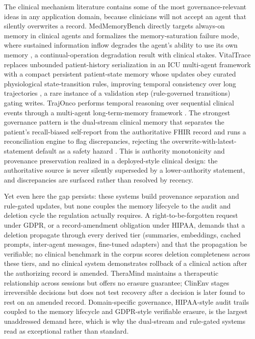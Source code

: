The clinical mechanism literature contains some of the most governance-relevant ideas in any application domain, because clinicians will not accept an agent that silently overwrites a record. MedMemoryBench directly targets always-on memory in clinical agents and formalizes the memory-saturation failure mode, where sustained information inflow degrades the agent's ability to use its own memory \citep{wang2026medmemorybench}, a continual-operation degradation result with clinical stakes. VitalTrace replaces unbounded patient-history serialization in an ICU multi-agent framework with a compact persistent patient-state memory whose updates obey curated physiological state-transition rules, improving temporal consistency over long trajectories \citep{qu2026vitaltrace}, a rare instance of a validation step (rule-governed transitions) gating writes. TrajOnco performs temporal reasoning over sequential clinical events through a multi-agent long-term-memory framework \citep{zeng2026trajonco}. The strongest governance pattern is the dual-stream clinical memory that separates the patient's recall-biased self-report from the authoritative FHIR record and runs a reconciliation engine to flag discrepancies, rejecting the overwrite-with-latest-statement default as a safety hazard \citep{pugh2026dualstream}. This is authority monotonicity and provenance preservation realized in a deployed-style clinical design: the authoritative source is never silently superseded by a lower-authority statement, and discrepancies are surfaced rather than resolved by recency.

Yet even here the gap persists: these systems build provenance separation and rule-gated updates, but none couples the memory lifecycle to the audit and deletion cycle the regulation actually requires. A right-to-be-forgotten request under GDPR, or a record-amendment obligation under HIPAA, demands that a deletion propagate through every derived tier (summaries, embeddings, cached prompts, inter-agent messages, fine-tuned adapters) and that the propagation be verifiable; no clinical benchmark in the corpus scores deletion completeness across these tiers, and no clinical system demonstrates rollback of a clinical action after the authorizing record is amended. TheraMind maintains a therapeutic relationship across sessions but offers no erasure guarantee; ClinEnv stages irreversible decisions but does not test recovery after a decision is later found to rest on an amended record. Domain-specific governance, HIPAA-style audit trails coupled to the memory lifecycle and GDPR-style verifiable erasure, is the largest unaddressed demand here, which is why the dual-stream and rule-gated systems read as exceptional rather than standard.

